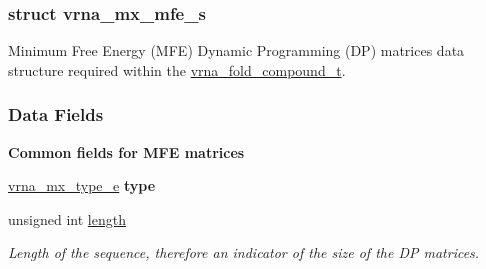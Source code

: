 \subsubsection{struct vrna\-\_\-mx\-\_\-mfe\-\_\-s}
Minimum Free Energy (M\-F\-E) Dynamic Programming (D\-P) matrices data structure required within the \hyperlink{group__fold__compound_ga1b0cef17fd40466cef5968eaeeff6166}{vrna\-\_\-fold\-\_\-compound\-\_\-t}. \subsubsection*{Data Fields}
\begin{Indent}{\bf Common fields for M\-F\-E matrices}\par
\begin{DoxyCompactItemize}
\item 
\hypertarget{group__dp__matrices_a468680aa937b664d453075108d976ae2}{\hyperlink{group__dp__matrices_ga6042ea1d58d01931e959791be6d89343}{vrna\-\_\-mx\-\_\-type\-\_\-e} {\bfseries type}}\label{group__dp__matrices_a468680aa937b664d453075108d976ae2}

\item 
\hypertarget{group__dp__matrices_a1f92a8406fc1fb721dbf9193c34ad826}{unsigned int \hyperlink{group__dp__matrices_a1f92a8406fc1fb721dbf9193c34ad826}{length}}\label{group__dp__matrices_a1f92a8406fc1fb721dbf9193c34ad826}

\begin{DoxyCompactList}\small\item\em Length of the sequence, therefore an indicator of the size of the D\-P matrices. \end{DoxyCompactList}\end{DoxyCompactItemize}
\end{Indent}

